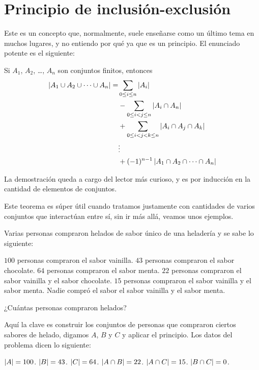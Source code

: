 \section{Principio de inclusión-exclusión}
Este es un concepto que, normalmente, suele
enseñarse como un último tema en muchos lugares,
y no entiendo por qué ya que es un principio.
El enunciado potente es el siguiente:
\begin{proposition}
	Si $A_1$, $A_2$, \dots, $A_n$ son conjuntos finitos, entonces
	\begin{align*}
		\left\lvert A_1 \cup A_2 \cup \cdots \cup A_n \right\rvert = & \sum_{0 \leq i \leq n}\left\lvert A_i \right\rvert                             \\
		                                          & - \sum_{0 \leq i < j \leq n}\left\lvert A_i\cap A_n \right\rvert               \\
		                                          & + \sum_{0 \leq i < j < k \leq n}\left\lvert A_i \cap A_j \cap A_k \right\rvert \\
		                                          & \vdots                                                      \\
		                                          & + (-1)^{n - 1} \left\lvert A_1 \cap A_2 \cap \cdots \cap A_n \right\rvert
	\end{align*}
\end{proposition}
La demostración queda a cargo del lector
más curioso, %
y es por inducción en la cantidad de
elementos de conjuntos.

Este teorema es súper útil cuando tratamos
justamente con cantidades de varios
conjuntos que interactúan entre sí,
sin ir más allá, veamos unos ejemplos.

\begin{example}
	Varias personas compraron helados
	de sabor único
	de una heladería y se sabe lo siguiente:
	\begin{itemize}
		\ii $100$ personas compraron el sabor vainilla.
		\ii $43$ personas compraron el sabor chocolate.
		\ii $64$ personas compraron el sabor menta.
		\ii $22$ personas compraron el sabor vainilla y el sabor chocolate.
		\ii $15$ personas compraron el sabor vainilla y el sabor menta.
		\ii Nadie compró el sabor el sabor vainilla y el sabor menta.
	\end{itemize}
	¿Cuántas personas compraron helados?
\end{example}

Aquí la clave es construir los conjuntos
de personas que compraron ciertos sabores de helado,
digamos $A$, $B$ y $C$ y aplicar el principio.
Los datos del problema dicen lo siguiente:
\begin{itemize}
	\ii $\left\lvert A \right\rvert = 100$.
	\ii $\left\lvert B \right\rvert = 43$.
	\ii $\left\lvert C \right\rvert = 64$.
	\ii $\left\lvert A \cap B \right\rvert = 22$.
	\ii $\left\lvert A \cap C \right\rvert = 15$.
	\ii $\left\lvert B \cap C \right\rvert = 0$.
\end{itemize}

